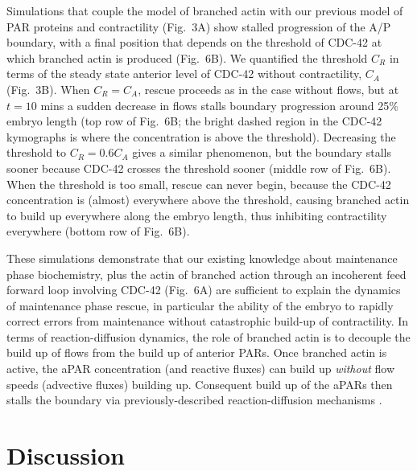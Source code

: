 \documentclass[11pt]{article}
\newcommand{\6}[1]{#1_{\text{6}}}
\newcommand{\3}[1]{#1_{\text{3}}}
\begin{document}
Simulations that couple the model of branched actin with our previous model of PAR proteins and contractility (Fig.\ 3A) show stalled progression of the A/P boundary, with a final position that depends on the threshold of CDC-42 at which branched actin is produced (Fig.\ 6B). We quantified the threshold $C_R$ in terms of the steady state anterior level of CDC-42 without contractility, $C_A$ (Fig.\ 3B). When $C_R = C_A$, rescue proceeds as in the case without flows, but at $t=10$ mins a sudden decrease in flows stalls boundary progression around 25\% embryo length (top row of Fig.\ 6B; the bright dashed region in the CDC-42 kymographs is where the concentration is above the threshold). Decreasing the threshold to $C_R = 0.6C_A$ gives a similar phenomenon, but the boundary stalls sooner because CDC-42 crosses the threshold sooner (middle row of Fig.\ 6B). When the threshold is too small, rescue can never begin, because the CDC-42 concentration is (almost) everywhere above the threshold, causing branched actin to build up everywhere along the embryo length, thus inhibiting contractility everywhere (bottom row of Fig.\ 6B). 

These simulations demonstrate that our existing knowledge about maintenance phase biochemistry, plus the actin of branched action through an incoherent feed forward loop involving CDC-42 (Fig.\ 6A) are sufficient to explain the dynamics of maintenance phase rescue, in particular the ability of the embryo to rapidly correct errors from maintenance without catastrophic build-up of contractility. In terms of reaction-diffusion dynamics, the role of branched actin is to decouple the build up of flows from the build up of anterior PARs. Once branched actin is active, the aPAR concentration (and reactive fluxes) can build up \emph{without} flow speeds (advective fluxes) building up. Consequent build up of the aPARs then stalls the boundary via previously-described reaction-diffusion mechanisms \citep{mori2008wave,goehring2011polarization}.


\section*{Discussion}
\end{document}
